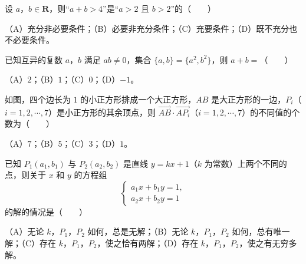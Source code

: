 \begin{question}
设 $a$，$b\in\mathbf R$，则“$a+b>4$”是“$a>2$ 且 $b>2$”的\mbox{（　　）}

（A）充分非必要条件；（B）必要非充分条件；（C）充要条件；（D）既不充分也不必要条件。

\end{question}
\begin{question}
已知互异的复数 $a$，$b$ 满足 $ab\neq0$，集合 $\{a,b\}=\{a^2,b^2\}$，则 $a+b=$\mbox{（　　）}

（A）$2$；（B）$1$；（C）$0$；（D）$-1$。

\Needspace{0.4\textheight}
\end{question}
\begin{question}
如图，四个边长为 $1$ 的小正方形排成一个大正方形，$AB$ 是大正方形的一边，$P_i$（$i=1,2,\cdots,7$）是小正方形的其余顶点，则 $\overrightarrow{AB}\cdot\overrightarrow{AP_i}$（$i=1,2,\cdots,7$）的不同值的个数为\mbox{（　　）}
\nopagebreak[4]
\begin{center}\end{center}
\nopagebreak[4]
（A）$7$；（B）$5$；（C）$3$；（D）$1$。

\end{question}
\begin{question}
已知 $P_1(a_1,b_1)$ 与 $P_2(a_2,b_2)$ 是直线 $y=kx+1$（$k$ 为常数）上两个不同的点，则关于 $x$ 和 $y$ 的方程组
\nopagebreak[4]
\[\begin{cases}
a_1x+b_1y=1,\\
a_2x+b_2y=1
\end{cases}\]
的解的情况是\mbox{（　　）}

（A）无论 $k$，$P_1$，$P_2$ 如何，总是无解；（B）无论 $k$，$P_1$，$P_2$ 如何，总有唯一解；（C）存在 $k$，$P_1$，$P_2$，使之恰有两解；（D）存在 $k$，$P_1$，$P_2$，使之有无穷多解。

\end{question}

